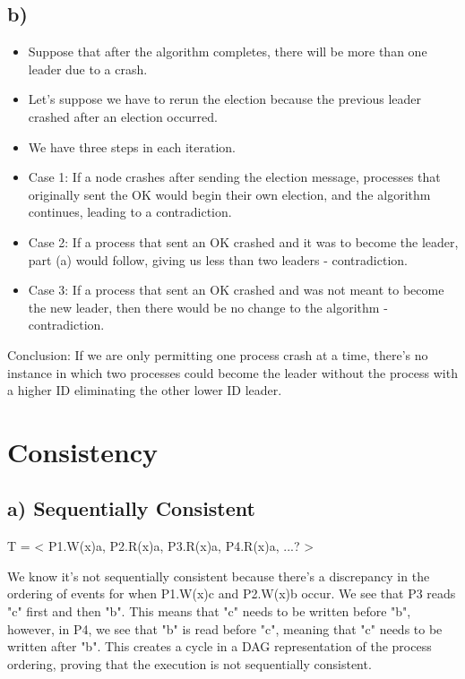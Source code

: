 \documentclass[12pt]{article}
\begin{document}
\subsection*{b)}
\begin{itemize}
\item Suppose that after the algorithm completes, there will be more than one leader due to a crash.
\item Let's suppose we have to rerun the election because the previous leader crashed after an election occurred.
\item We have three steps in each iteration.
\item Case 1: If a node crashes after sending the election message, processes that originally sent the OK would begin their own election, and the algorithm continues, leading to a contradiction.
\item Case 2: If a process that sent an OK crashed and it was to become the leader, part (a) would follow, giving us less than two leaders - contradiction.
\item Case 3: If a process that sent an OK crashed and was not meant to become the new leader, then there would be no change to the algorithm - contradiction.
\end{itemize}
Conclusion: If we are only permitting one process crash at a time, there's no instance in which two processes could become the leader without the process with a higher ID eliminating the other lower ID leader.
\section{Consistency}
\subsection*{a) Sequentially Consistent}
T = < P1.W(x)a, P2.R(x)a, P3.R(x)a, P4.R(x)a, ...? >

We know it's not sequentially consistent because there's a discrepancy in the ordering of events for when  P1.W(x)c and P2.W(x)b occur. We see that P3 reads "c" first and then "b". This means that "c" needs to be written before "b", however, in P4, we see that "b" is read before "c", meaning that "c" needs to be written after "b". This creates a cycle in a DAG representation of the process ordering, proving that the execution is not sequentially consistent.
\end{document}
